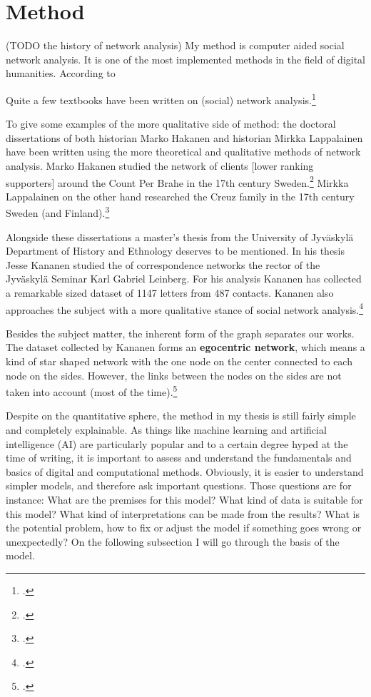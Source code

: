 \section{Method}
\label{method}

(TODO the history of network analysis)
My method is computer aided social network analysis. It is one of the most implemented methods in the field of digital humanities. According to  

Quite a few textbooks have been written on (social) network analysis.\footcites[See e. g. ][or Krishna Raj P. M., Ankith Mohan and K. G. Srinivasa \textit{Practical Social Network Analysis with Python} or Xiaoming Fu et al. \textit{Social Network Analysis: Interdisciplinary Approaches and Case Studies}.]{huhtamakiEtAl}

To give some examples of the more qualitative side of method: the doctoral dissertations of both historian Marko Hakanen and historian Mirkka Lappalainen have been written using the more theoretical and qualitative methods of network analysis. Marko Hakanen studied the network of clients [lower ranking supporters] around the Count Per Brahe in the 17th century Sweden.\footcite{hakanen11} Mirkka Lappalainen on the other hand researched the Creuz family in the 17th century Sweden (and Finland).\footcite{lappalainen05}

Alongside these dissertations a master's thesis from the University of Jyväskylä Department of History and Ethnology deserves to be mentioned. In his thesis Jesse Kananen studied the of correspondence networks the rector of the Jyväskylä Seminar Karl Gabriel Leinberg. For his analysis Kananen has collected a remarkable sized dataset of 1147 letters from 487 contacts. Kananen also approaches the subject with a more qualitative stance of social network analysis.\footcite{kananen18}

Besides the subject matter, the inherent form of the graph separates our works. The dataset collected by Kananen forms an \textbf{egocentric network}, which means a kind of star shaped network with the one node on the center connected to each node on the sides. However, the links between the nodes on the sides are not taken into account (most of the time).\footcite[pp. 22-23.]{kananen18}

Despite on the quantitative sphere, the method in my thesis is still fairly simple and completely explainable. As things like machine learning and artificial intelligence (AI) are particularly popular and to a certain degree hyped at the time of writing, it is important to assess and understand the fundamentals and basics of digital and computational methods. Obviously, it is easier to understand simpler models, and therefore ask important questions. Those questions are for instance: What are the premises for this model? What kind of data is suitable for this model? What kind of interpretations can be made from the results? What is the potential problem, how to fix or adjust the model if something goes wrong or unexpectedly? On the following subsection I will go through the basis of the model.

